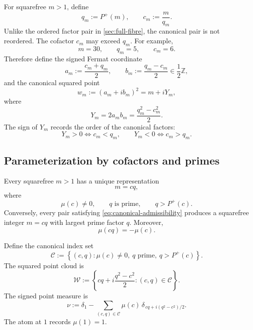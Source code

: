 \documentclass[11pt]{article}
\theoremstyle{definition}
\theoremstyle{remark}
\newcommand{\Pplus}{P^{+}}
\newcommand{\1}{\mathbf{1}}
\newcommand{\Z}{\mathbb{Z}}
\begin{document}
For squarefree $m>1$, define
\begin{equation}
 q_m:=\Pplus(m),
 \qquad
 c_m:=\frac{m}{q_m}.
 \label{eq:canonical-cq}
\end{equation}
Unlike the ordered factor pair in \cref{sec:full-fibre}, the canonical pair is not reordered.  The cofactor $c_m$ may exceed $q_m$.  For example,
\[
 m=30,
 \qquad
 q_m=5,
 \qquad
 c_m=6.
\]
Therefore define the signed Fermat coordinate
\begin{equation}
 a_m:=\frac{c_m+q_m}{2},
 \qquad
 b_m:=\frac{q_m-c_m}{2}\in\frac12\Z,
 \label{eq:signed-Fermat}
\end{equation}
and the canonical squared point
\begin{equation}
 w_m:=(a_m+ib_m)^2
 =m+iY_m,
 \label{eq:canonical-w}
\end{equation}
where
\begin{equation}
 \boxed{Y_m=2a_mb_m=\frac{q_m^2-c_m^2}{2}.}
 \label{eq:signed-Y}
\end{equation}
The sign of $Y_m$ records the order of the canonical factors:
\begin{equation}
 Y_m>0\iff c_m<q_m,
 \qquad
 Y_m<0\iff c_m>q_m.
 \label{eq:Y-sign}
\end{equation}

\subsection{Parameterization by cofactors and primes}

Every squarefree $m>1$ has a unique representation
\begin{equation}
 m=cq,
 \label{eq:cq-general}
\end{equation}
where
\begin{equation}
 \mu(c)\ne0,
 \qquad
 q\text{ is prime},
 \qquad
 q>\Pplus(c).
 \label{eq:canonical-admissibility}
\end{equation}
Conversely, every pair satisfying \cref{eq:canonical-admissibility} produces a squarefree integer $m=cq$ with largest prime factor $q$.  Moreover,
\begin{equation}
 \mu(cq)=-\mu(c).
 \label{eq:canonical-sign}
\end{equation}

Define the canonical index set
\begin{equation}
 \mathscr C
 :=
 \left\{
 (c,q):
 \mu(c)\ne0,
 \ q\text{ prime},
 \ q>\Pplus(c)
 \right\}.
 \label{eq:canonical-index}
\end{equation}
The squared point cloud is
\begin{equation}
 \mathscr W
 :=
 \left\{
 cq+i\frac{q^2-c^2}{2}:(c,q)\in\mathscr C
 \right\}.
 \label{eq:canonical-cloud}
\end{equation}
The signed point measure is
\begin{equation}
 \nu
 :=
 \delta_1
 -
 \sum_{(c,q)\in\mathscr C}
 \mu(c)\,
 \delta_{\,cq+i(q^2-c^2)/2}.
 \label{eq:signed-measure}
\end{equation}
The atom at $1$ records $\mu(1)=1$.
\end{document}
